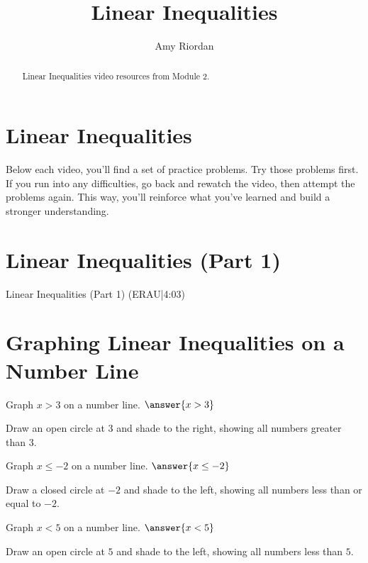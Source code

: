 \documentclass{ximera}
\title{Linear Inequalities}
\author{Amy Riordan}
\begin{document}
\begin{abstract}
Linear Inequalities video resources from Module 2.
\end{abstract}
\maketitle

\section*{Linear Inequalities}

Below each video, you’ll find a set of practice problems. Try those problems first. If you run into any difficulties, go back and rewatch the video, then attempt the problems again. This way, you’ll reinforce what you’ve learned and build a stronger understanding.

\section*{Linear Inequalities (Part 1)}

Linear Inequalities (Part 1) (ERAU|4:03)



\section*{Graphing Linear Inequalities on a Number Line}

\begin{problem}
Graph $x > 3$ on a number line. $\answer{x > 3}$
\begin{feedback}
Draw an open circle at $3$ and shade to the right, showing all numbers greater than $3$.
\end{feedback}
\end{problem}

\begin{problem}
Graph $x \leq -2$ on a number line. $\answer{x \leq -2}$
\begin{feedback}
Draw a closed circle at $-2$ and shade to the left, showing all numbers less than or equal to $-2$.
\end{feedback}
\end{problem}

\begin{problem}
Graph $x < 5$ on a number line. $\answer{x < 5}$
\begin{feedback}
Draw an open circle at $5$ and shade to the left, showing all numbers less than $5$.
\end{feedback}
\end{problem}
\end{document}
